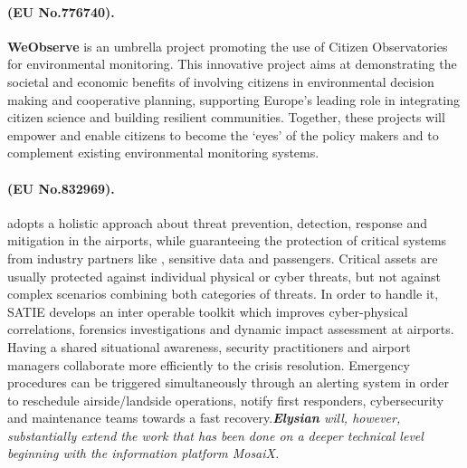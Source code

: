 \documentclass[a4paper,11pt]{article}
\newcommand{\project}[1]{\textbf{#1}\xspace}
\newcommand{\SECURITY}{\project{Elysian}}
\newcommand{\TheProject}{\SECURITY}
\begin{document}
\begin{mdframed}[backgroundcolor=blue!5]
\paragraph{\weobserve (EU No.776740).}
\textbf{WeObserve} is an umbrella project promoting the use of Citizen Observatories for environmental monitoring.  This innovative project aims at demonstrating the societal and economic benefits of involving citizens in environmental decision making and cooperative planning, supporting Europe’s leading role in integrating citizen science and building resilient communities. Together, these projects will empower and enable citizens to become the ‘eyes’ of the policy makers and to complement existing environmental monitoring systems.
\end{mdframed}

\begin{mdframed}[backgroundcolor=blue!5]
\paragraph{\satie (EU No.832969).}
\satie adopts a holistic approach about threat prevention, detection, response and mitigation in the airports, while guaranteeing the protection of critical systems from industry partners like \FRQshort{}, sensitive data and passengers. Critical assets are usually protected against individual physical or cyber threats, but not against complex scenarios combining both categories of threats. In order to handle it, SATIE develops an inter operable toolkit which improves cyber-physical correlations, forensics investigations and dynamic impact assessment at airports. Having a shared situational awareness, security practitioners and airport managers collaborate more efficiently to the crisis resolution. Emergency procedures can be triggered simultaneously through an alerting system in order to reschedule airside/landside operations, notify first responders, cybersecurity and maintenance teams towards a fast recovery.\emph{\TheProject will, however, substantially extend the work that has been done on a deeper technical level beginning with the information platform MosaiX.}
\end{mdframed}
\end{document}
